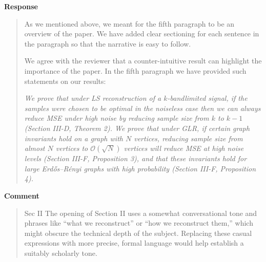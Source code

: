 \documentclass[11pt,onecolumn,journal]{IEEEtran}
\theoremstyle{definition}
\begin{document}
\textbf{Response}
\begin{quote}


As we mentioned above, we meant for the fifth paragraph to be an overview of the paper. We have added clear sectioning for each sentence in the paragraph so that the narrative is easy to follow.

We agree with the reviewer that a counter-intuitive result can highlight the importance of the paper. In the fifth paragraph we have provided such statements on our results:

{\it We prove that under LS reconstruction of a $k$-bandlimited signal, if the samples were chosen to be optimal in the noiseless case then we can always reduce MSE under high noise by reducing sample size from $k$ to $k-1$ {(Section III-D, Theorem 2)}. 
We prove that under GLR, if certain graph invariants hold on a graph with $N$ vertices, reducing sample size from almost $N$ vertices to $\mathcal{O}(\sqrt{N})$ vertices will reduce MSE at high noise levels {(Section III-F, Proposition 3)}, and that these invariants hold for large Erdős–Rényi graphs with high probability {(Section III-F, Proposition 4)}.}

\iffalse
\begin{itemize}
    \item For any graph, under a noiseless optimal sampling scheme and LS reconstruction, reducing sample size from $k$ to $k-1$ yields improved accuracy at sufficiently high noise levels.
    \item W.h.p for large Erdos-Renyi graphs, (and under certain constraints on $\mu$ that we discuss later) reducing sample size from almost $N$ vertices to $\mathcal{O}(\sqrt{N})$ yields improved accuracy of reconstruction at sufficiently high noise levels.
\end{itemize}
\fi
\end{quote}

\textbf{Comment}
\begin{quote}
Sec II
The opening of Section II uses a somewhat conversational tone and phrases like “what we reconstruct” or “how we reconstruct them,” which might obscure the technical depth of the subject. Replacing these casual expressions with more precise, formal language would help establish a suitably scholarly tone.
\end{quote}
\end{document}
